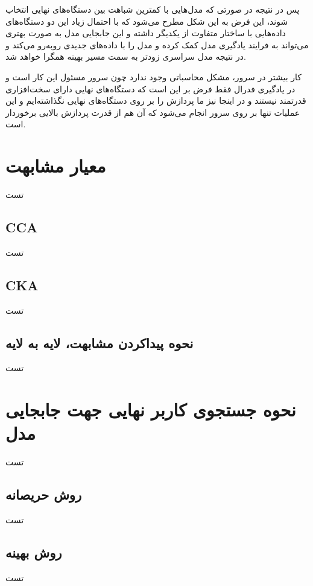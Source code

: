 پس در نتیجه در صورتی که مدل‌هایی با کمترین شباهت بین دستگاه‌های نهایی انتخاب شوند،‌ این فرض به این شکل مطرح می‌شود که با احتمال زیاد این دو دستگاه‌های داده‌هایی با ساختار متفاوت از یکدیگر داشته و این جابجایی مدل به صورت بهتری می‌تواند به فرایند یادگیری مدل کمک کرده و مدل را با داده‌های جدیدی روبه‌رو می‌کند و در نتیجه مدل سراسری زودتر به سمت مسیر بهینه همگرا خواهد شد.


کار بیشتر در سرور، مشکل محاسباتی وجود ندارد چون سرور مسئول این کار است و در یادگیری فدرال فقط فرض بر این است که دستگاه‌های نهایی دارای سخت‌افزاری قدرتمند نیستند و در اینجا نیز ما پردازش را بر روی دستگاه‌های نهایی نگذاشته‌ایم و این عملیات تنها بر روی سرور انجام می‌شود که آن هم از قدرت پردازش بالایی برخوردار است.


\section{معیار مشابهت}
تست

\subsection{CCA}
تست

\subsection{CKA}
تست

\subsection{نحوه پیداکردن مشابهت، لایه به لایه}
تست

\section{نحوه جستجوی کاربر نهایی جهت جابجایی مدل}
تست

\subsection{روش حریصانه}
تست

\subsection{روش بهینه}
تست





